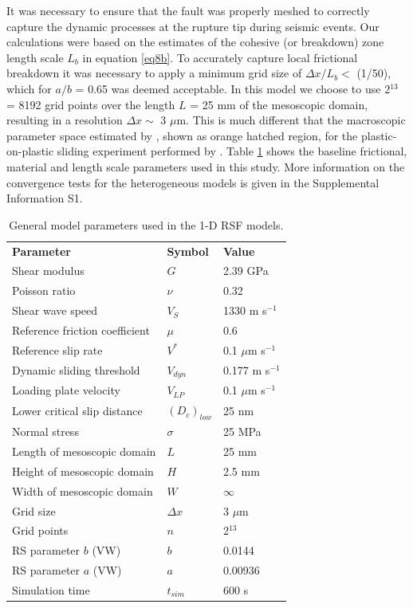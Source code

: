 \documentclass[preprint,1p, 10pt,authoryear]{elsarticle}
\begin{document}
It was necessary to ensure that the fault was properly meshed to correctly capture the dynamic processes at the rupture tip during seismic events. Our calculations were based on the estimates of the cohesive (or breakdown) zone length scale $L_{b}$ in equation \eqref{eq8b}. To accurately capture local frictional breakdown it was necessary to apply a minimum grid size of $\Delta x/L_{b} <$ (1/50), which for $a/b$ = 0.65 was deemed acceptable.  In this model we choose to use 2$^{13}$ = 8192 grid points over the length $L$ = 25 mm of the mesoscopic domain, resulting in a resolution $\Delta x \sim$  3 $\mu$m. This is much different that the macroscopic parameter space estimated by \citet{Kaneko2016}, shown as orange hatched region, for the plastic-on-plastic sliding experiment performed by \citet{Latour2013}. Table \ref{table1} shows the baseline frictional, material and length scale parameters used in this study. More information on the convergence tests for the heterogeneous models is given in the Supplemental Information S1.

\begin{table}[ht]
	\centering
	\caption{General model parameters used in the 1-D RSF models.}
	\begin{tabular}{ m{5cm} m{2cm} m{4cm}} 
		\hline  
		\bf{Parameter} 			& \bf{Symbol} 		& \bf{Value}	\\
		Shear modulus  			& $G$  		 	& 2.39 GPa		\\
		Poisson ratio  			& $\nu$  	 	& 0.32 		\\
		Shear wave speed		& $V_{S}$      		& 1330 m s$^{-1}$	\\
		Reference friction coefficient	& $\mu$	        & 0.6	\\
		Reference slip rate  		& $V^{*}$     		&  0.1 $\mu$m s$^{-1}$\\
		Dynamic sliding threshold   	& $V_{dyn}$  		& 0.177 m s$^{-1}$ \\
		Loading plate velocity  	& $V_{LP}$     		&  0.1 $\mu$m s$^{-1}$\\
		Lower critical slip distance 	& $\left(D_{c}\right)_{low}$    &  25 nm\\
		Normal stress 			& $\sigma$  		&  25 MPa \\
		Length of mesoscopic domain 	&   $L$  		& 25 mm\\
		Height of mesoscopic domain 	&   $H$  		& 2.5 mm\\
		Width of mesoscopic domain 	&   $W$   		& $\infty$\\
		Grid size 			& $\Delta x$ 		& 3 $\mu$m \\
		Grid points 			& $n$ 			& 2$^{13}$ \\
		RS parameter $b$ (VW)  		& $b$ 			& 0.0144  \\
		RS parameter $a$ (VW)  		& $a$ 			& 0.00936  \\
	    Simulation time 			& $t_{sim}$ 		& 600 s  \\
		\hline  	
	\end{tabular}
	\label{table1}
\end{table}
\end{document}
